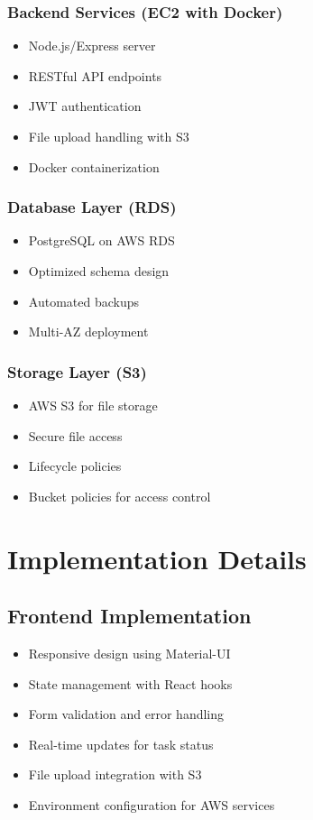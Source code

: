 \documentclass[12pt,a4paper]{article}
\begin{document}
\subsubsection{Backend Services (EC2 with Docker)}
\begin{itemize}
    \item Node.js/Express server
    \item RESTful API endpoints
    \item JWT authentication
    \item File upload handling with S3
    \item Docker containerization
\end{itemize}

\subsubsection{Database Layer (RDS)}
\begin{itemize}
    \item PostgreSQL on AWS RDS
    \item Optimized schema design
    \item Automated backups
    \item Multi-AZ deployment
\end{itemize}

\subsubsection{Storage Layer (S3)}
\begin{itemize}
    \item AWS S3 for file storage
    \item Secure file access
    \item Lifecycle policies
    \item Bucket policies for access control
\end{itemize}

\section{Implementation Details}

\subsection{Frontend Implementation}
\begin{itemize}
    \item Responsive design using Material-UI
    \item State management with React hooks
    \item Form validation and error handling
    \item Real-time updates for task status
    \item File upload integration with S3
    \item Environment configuration for AWS services
\end{itemize}
\end{document}
